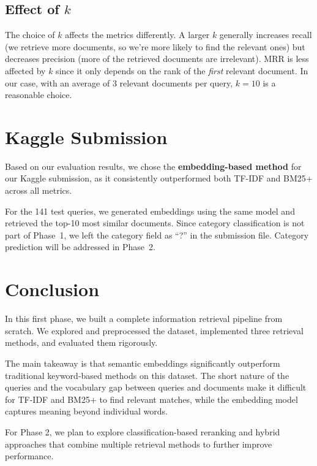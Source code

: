 \documentclass[12pt,a4paper]{article}
\begin{document}
\subsection{Effect of $k$}

The choice of $k$ affects the metrics differently. A larger $k$ generally increases recall (we retrieve more documents, so we're more likely to find the relevant ones) but decreases precision (more of the retrieved documents are irrelevant). MRR is less affected by $k$ since it only depends on the rank of the \textit{first} relevant document. In our case, with an average of 3 relevant documents per query, $k=10$ is a reasonable choice.

\section{Kaggle Submission}

Based on our evaluation results, we chose the \textbf{embedding-based method} for our Kaggle submission, as it consistently outperformed both TF-IDF and BM25+ across all metrics.

For the 141 test queries, we generated embeddings using the same model and retrieved the top-10 most similar documents. Since category classification is not part of Phase~1, we left the category field as ``?'' in the submission file. Category prediction will be addressed in Phase~2.

\section{Conclusion}

In this first phase, we built a complete information retrieval pipeline from scratch. We explored and preprocessed the dataset, implemented three retrieval methods, and evaluated them rigorously.

The main takeaway is that semantic embeddings significantly outperform traditional keyword-based methods on this dataset. The short nature of the queries and the vocabulary gap between queries and documents make it difficult for TF-IDF and BM25+ to find relevant matches, while the embedding model captures meaning beyond individual words.

For Phase 2, we plan to explore classification-based reranking and hybrid approaches that combine multiple retrieval methods to further improve performance.
\end{document}
